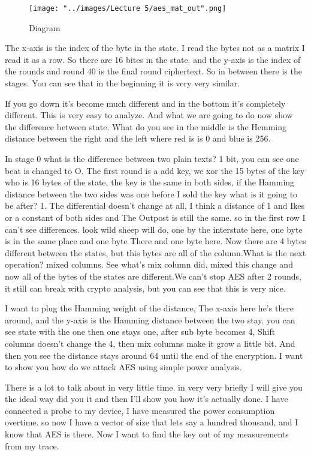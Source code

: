 \documentclass{report}
\begin{document}
\begin{figure}[htp]
\centering
\texttt{[image: "../images/Lecture 5/aes\_mat\_out".png]}
\caption{Diagram}
\label{}
\end{figure}

The x-axis is the index of the byte in the state. I read the bytes not as a matrix I read it as a row. So there are 16 bites in the state. and the y-axis is the index of the rounds and round 40 is the final round ciphertext. So in between there is the stages.
You can see that in the beginning it is very very similar.

If you go down it's become much different and in the bottom it's completely different. This is very easy to analyze. And what we are going to do now show the difference between state. What do you see in the middle is the Hemming distance between the right and the left where red is is 0 and blue is 256.

In stage 0 what is the difference between two plain texts? 1 bit, you can see one beat is changed to O. The first round is a add key, we xor the 15 bytes of the key who is 16 bytes of the state, the key is the same in both sides, if the Hamming distance between the two sides was one before I sold the key what is it going to be after? 1. The differential doesn't change at all, I think a distance of 1 and Ikes or a constant of both sides and The Outpost is still the same. so in the first row I can't see differences. look wild sheep will do, one by the interstate here, one byte is in the same place and one byte There and one byte here. Now there are 4 bytes different between the states, but this bytes are all of the column.What is the next operation? mixed columns. See what's mix column did, mixed this change and now all of the bytes of the states are different.We can't stop AES after 2 rounds, it still can break with crypto analysis, but you can see that this is very nice.
 
I want to plug the Hamming weight of the distance, The x-axis here he's there around, and the y-axis is the Hamming distance between the two stay. you can see state with the one then one stays one, after sub byte becomes 4, Shift columns doesn't change the 4, then mix columns make it grow a little bit. And then you see the distance stays around 64 until the end of the encryption.
I want to show you how do we attack AES using simple power analysis.

There is a lot to talk about in very little time. in very very briefly I will give you the ideal way did you it and then I'll show you how it's actually done.
I have connected a probe to my device, I have measured the power consumption overtime. so now I have a vector of size that lets say a hundred thousand, and I know that AES is there. Now I want to find the key out of my measurements from my trace.
\end{document}
